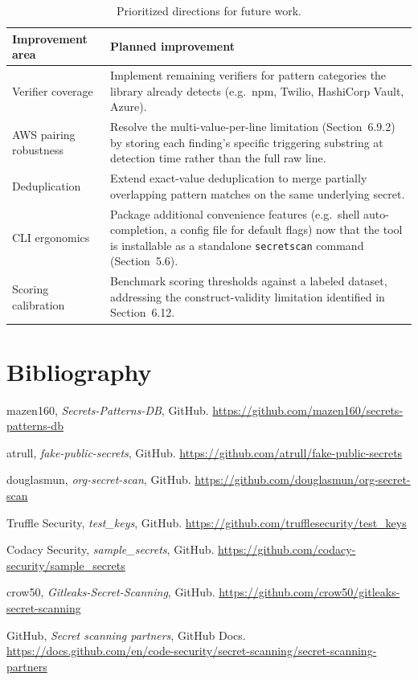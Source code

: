 \documentclass[12pt]{article}
\begin{document}
\begin{table}[h]
\centering
\begin{tabularx}{\textwidth}{|p{}|Y|}
\hline
\textbf{Improvement area} & \textbf{Planned improvement} \\
\hline
Verifier coverage & Implement remaining verifiers for pattern categories the library already detects (e.g.\ npm, Twilio, HashiCorp Vault, Azure). \\
AWS pairing robustness & Resolve the multi-value-per-line limitation (Section~6.9.2) by storing each finding's specific triggering substring at detection time rather than the full raw line. \\
Deduplication & Extend exact-value deduplication to merge partially overlapping pattern matches on the same underlying secret. \\
CLI ergonomics & Package additional convenience features (e.g.\ shell auto-completion, a config file for default flags) now that the tool is installable as a standalone \texttt{secretscan} command (Section~5.6). \\
Scoring calibration & Benchmark scoring thresholds against a labeled dataset, addressing the construct-validity limitation identified in Section~6.12. \\
\hline
\end{tabularx}
\caption{Prioritized directions for future work.}
\label{tab:future-work}
\end{table}

\newpage

\section{Bibliography}

\begin{thebibliography}{9}

 mazen160, \emph{Secrets-Patterns-DB}, GitHub. \url{https://github.com/mazen160/secrets-patterns-db}

 atrull, \emph{fake-public-secrets}, GitHub. \url{https://github.com/atrull/fake-public-secrets}

 douglasmun, \emph{org-secret-scan}, GitHub. \url{https://github.com/douglasmun/org-secret-scan}

 Truffle Security, \emph{test\_keys}, GitHub. \url{https://github.com/trufflesecurity/test_keys}

 Codacy Security, \emph{sample\_secrets}, GitHub. \url{https://github.com/codacy-security/sample_secrets}

 crow50, \emph{Gitleaks-Secret-Scanning}, GitHub. \url{https://github.com/crow50/gitleaks-secret-scanning}

 GitHub, \emph{Secret scanning partners}, GitHub Docs. \url{https://docs.github.com/en/code-security/secret-scanning/secret-scanning-partners}

\end{thebibliography}
\end{document}
